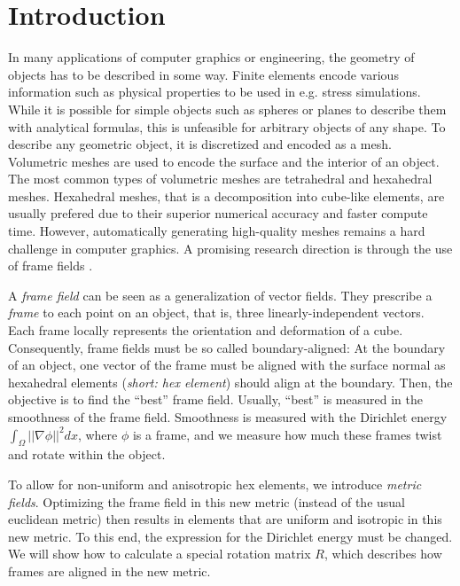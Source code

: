\documentclass[../thesis.tex]{subfiles}
\begin{document}
\chapter{Introduction}
\label{ch:intro}
In many applications of computer graphics or engineering, the geometry of objects
has to be described in some way. Finite elements encode various information such as physical properties
to be used in e.g. stress simulations.
While it is possible for simple objects such as spheres or planes to describe them
with analytical formulas, this is unfeasible for arbitrary objects of any shape.
To describe any geometric object, it is discretized and encoded as a mesh.
Volumetric meshes are used to encode the surface and the interior of an object.
The most common types of volumetric meshes are tetrahedral and hexahedral meshes.
Hexahedral meshes, that is a decomposition into cube-like elements,
are usually prefered due to their superior numerical accuracy and faster compute time.
However, automatically generating high-quality meshes remains a hard challenge
in computer graphics.
A promising research direction is through the use of frame fields \cite{Hex22}.

A \emph{frame field} can be seen as a generalization of vector fields.
They prescribe a \emph{frame} to each point on an object, that is, three linearly-independent
vectors. Each frame locally represents the orientation and deformation of a cube.
Consequently, frame fields must be so called boundary-aligned:
At the boundary of an object, one vector of the frame must be aligned with the surface normal
as hexahedral elements (\emph{short: hex element}) should align at the boundary.
Then, the objective is to find the ``best'' frame field.
Usually, ``best'' is measured in the smoothness of the frame field.
Smoothness is measured with the Dirichlet energy $\int_{\Omega}||\nabla \phi||^2dx$,
where $\phi$ is a frame, and we measure how much these frames twist and rotate within the object.

To allow for non-uniform and anisotropic hex elements, we introduce
\emph{metric fields}. Optimizing the frame field in this new metric (instead of the usual euclidean metric) then results
in elements that are uniform and isotropic in this new metric.
To this end, the expression for the Dirichlet energy must be changed.
We will show how to calculate a special rotation matrix $R$, which describes
how frames are aligned in the new metric.
\end{document}

